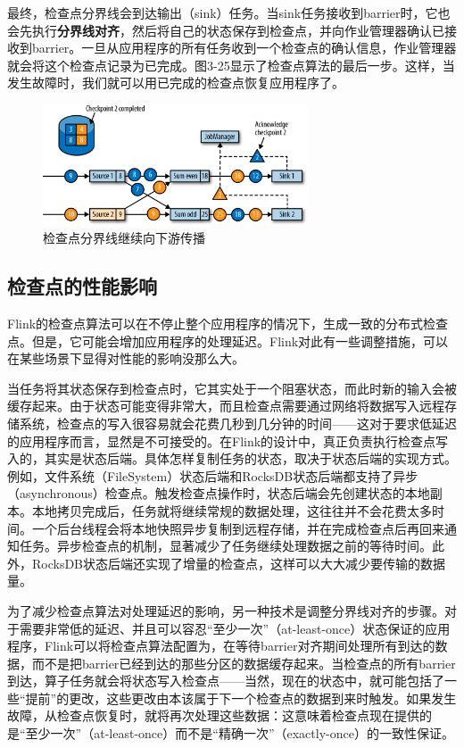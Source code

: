 \documentclass[cn,11pt,chinese]{elegantbook}
\begin{document}
最终，检查点分界线会到达输出（sink）任务。当sink任务接收到barrier时，它也会先执行\textbf{分界线对齐}，然后将自己的状态保存到检查点，并向作业管理器确认已接收到barrier。一旦从应用程序的所有任务收到一个检查点的确认信息，作业管理器就会将这个检查点记录为已完成。图3-25显示了检查点算法的最后一步。这样，当发生故障时，我们就可以用已完成的检查点恢复应用程序了。

\begin{figure}[htbp]
    \centering
    \includegraphics[width=0.7\textwidth]{images/spaf_0325.png}
    \caption{检查点分界线继续向下游传播}
\end{figure}

\subsection{检查点的性能影响}

Flink的检查点算法可以在不停止整个应用程序的情况下，生成一致的分布式检查点。但是，它可能会增加应用程序的处理延迟。Flink对此有一些调整措施，可以在某些场景下显得对性能的影响没那么大。

当任务将其状态保存到检查点时，它其实处于一个阻塞状态，而此时新的输入会被缓存起来。由于状态可能变得非常大，而且检查点需要通过网络将数据写入远程存储系统，检查点的写入很容易就会花费几秒到几分钟的时间——这对于要求低延迟的应用程序而言，显然是不可接受的。在Flink的设计中，真正负责执行检查点写入的，其实是状态后端。具体怎样复制任务的状态，取决于状态后端的实现方式。例如，文件系统（FileSystem）状态后端和RocksDB状态后端都支持了异步（asynchronous）检查点。触发检查点操作时，状态后端会先创建状态的本地副本。本地拷贝完成后，任务就将继续常规的数据处理，这往往并不会花费太多时间。一个后台线程会将本地快照异步复制到远程存储，并在完成检查点后再回来通知任务。异步检查点的机制，显著减少了任务继续处理数据之前的等待时间。此外，RocksDB状态后端还实现了增量的检查点，这样可以大大减少要传输的数据量。

为了减少检查点算法对处理延迟的影响，另一种技术是调整分界线对齐的步骤。对于需要非常低的延迟、并且可以容忍“至少一次”（at-least-once）状态保证的应用程序，Flink可以将检查点算法配置为，在等待barrier对齐期间处理所有到达的数据，而不是把barrier已经到达的那些分区的数据缓存起来。当检查点的所有barrier到达，算子任务就会将状态写入检查点——当然，现在的状态中，就可能包括了一些“提前”的更改，这些更改由本该属于下一个检查点的数据到来时触发。如果发生故障，从检查点恢复时，就将再次处理这些数据：这意味着检查点现在提供的是“至少一次”（at-least-once）而不是“精确一次”（exactly-once）的一致性保证。
\end{document}
